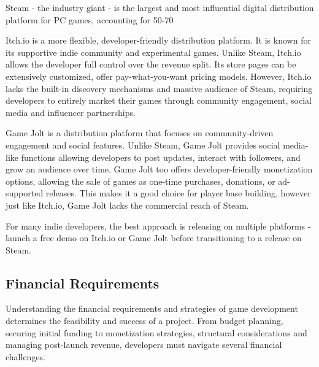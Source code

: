 Steam - the industry giant - is the largest and most influential digital distribution platform for PC games, accounting for 50-70%

Itch.io is a more flexible, developer-friendly distribution platform. It is known for its supportive indie community and experimental games. Unlike Steam, Itch.io allows the developer full control over the revenue split. Its store pages can be extensively customized, offer pay-what-you-want pricing models. However, Itch.io lacks the built-in discovery mechanisms and massive audience of Steam, requiring developers to entirely market their games through community engagement, social media and influencer partnerships.

Game Jolt is a distribution platform that focuses on community-driven engagement and social features. Unlike Steam, Game Jolt provides social media-like functions allowing developers to post updates, interact with followers, and grow an audience over time. Game Jolt too offers developer-friendly monetization options, allowing the sale of games as one-time purchases, donations, or ad-supported releases. This makes it a good choice for player base building, however just like Itch.io, Game Jolt lacks the commercial reach of Steam.

For many indie developers, the best approach is releasing on multiple platforms - launch a free demo on Itch.io or Game Jolt before transitioning to a release on Steam.

\subsection{Financial Requirements}
Understanding the financial requirements and strategies of game development determines the feasibility and success of a project. From budget planning, securing initial funding to monetization strategies, structural considerations and managing post-launch revenue, developers must navigate several financial challenges.

